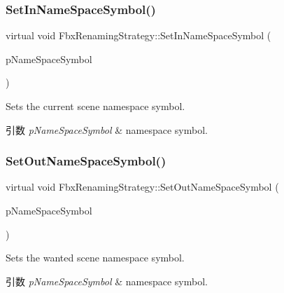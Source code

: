 \subsubsection{\texorpdfstring{Set\+In\+Name\+Space\+Symbol()}{SetInNameSpaceSymbol()}}
{\footnotesize\ttfamily virtual void Fbx\+Renaming\+Strategy\+::\+Set\+In\+Name\+Space\+Symbol (\begin{DoxyParamCaption}\item[{\hyperlink{class_fbx_string}{Fbx\+String}}]{p\+Name\+Space\+Symbol }\end{DoxyParamCaption})\hspace{0.3cm}{\ttfamily [virtual]}}

Sets the current scene namespace symbol. 
\begin{DoxyParams}{引数}
{\em p\+Name\+Space\+Symbol} & namespace symbol. \\
\hline
\end{DoxyParams}
\mbox{\label{class_fbx_renaming_strategy_a83507388cab84a8905861a8331d57092}} 
\subsubsection{\texorpdfstring{Set\+Out\+Name\+Space\+Symbol()}{SetOutNameSpaceSymbol()}}
{\footnotesize\ttfamily virtual void Fbx\+Renaming\+Strategy\+::\+Set\+Out\+Name\+Space\+Symbol (\begin{DoxyParamCaption}\item[{\hyperlink{class_fbx_string}{Fbx\+String}}]{p\+Name\+Space\+Symbol }\end{DoxyParamCaption})\hspace{0.3cm}{\ttfamily [virtual]}}

Sets the wanted scene namespace symbol. 
\begin{DoxyParams}{引数}
{\em p\+Name\+Space\+Symbol} & namespace symbol. \\
\hline
\end{DoxyParams}
\mbox{\label{class_fbx_renaming_strategy_a64ccadd7f74e58d706548e6333721558}} 
